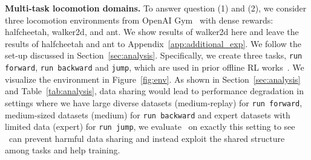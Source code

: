 \textbf{Multi-task locomotion domains.} To answer question (1) and (2), we consider three locomotion environments from OpenAI Gym~\citep{brockman2016openai} with dense rewards: halfcheetah, walker2d, and ant. We show results of walker2d here and leave the results of halfcheetah and ant to Appendix~\ref{app:additional_exp}. We follow the set-up discussed in Section~\ref{sec:analysis}. Specifically, we create three tasks, \texttt{run forward}, \texttt{run backward} and \texttt{jump}, which are used in prior offline RL works~\citep{yu2020mopo}. We visualize the environment in Figure~\ref{fig:env}. As shown in Section~\ref{sec:analysis} and Table~\ref{tab:analysis}, data sharing would lead to performance degradation in settings where we have large diverse datasets (medium-replay) for \texttt{run forward}, medium-sized datasets (medium) for \texttt{run backward} and expert datasets with limited data (expert) for \texttt{run jump}, we evaluate \methodname\ on exactly this setting to see \methodname\ can prevent harmful data sharing and instead exploit the shared structure among tasks and help training.

